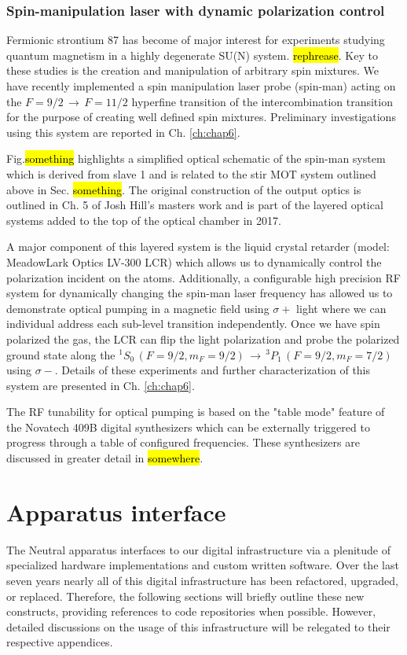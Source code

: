 \subsubsection{Spin-manipulation laser with dynamic polarization control}
Fermionic strontium 87 has become of major interest for experiments studying quantum magnetism in a highly degenerate SU(N) system. \hl{rephrease}.
Key to these studies is the creation and manipulation of arbitrary spin mixtures.
We have recently implemented a spin manipulation laser probe (spin-man) acting on the $F=9/2\,\rightarrow\,F=11/2$ hyperfine transition of the intercombination transition for the purpose of creating well defined spin mixtures.
Preliminary investigations using this system are reported in Ch. \ref{ch:chap6}.

Fig.\hl{something} highlights a simplified optical schematic of the spin-man system which is derived from slave 1 and is related to the stir MOT system outlined above in Sec. \hl{something}.
The original construction of the output optics is outlined in Ch. 5 of Josh Hill's masters work \cite{Hill2017} and is part of the layered optical systems added to the top of the optical chamber in 2017.

A major component of this layered system is the liquid crystal retarder (model: MeadowLark Optics LV-300 LCR) which allows us to dynamically control the polarization incident on the atoms.
Additionally, a configurable high precision RF system for dynamically changing the spin-man laser frequency has allowed us to demonstrate optical pumping in a magnetic field using $\sigma+$ light where we can individual address each sub-level transition independently.
Once we have spin polarized the gas, the LCR can flip the light polarization and probe the polarized ground state along the $^1S_0\,(F=9/2,m_F=9/2)\,\rightarrow\,^3P_1\,(F=9/2,m_F=7/2)$ using $\sigma-$.
Details of these experiments and further characterization of this system are presented in Ch. \ref{ch:chap6}. 

The RF tunability for optical pumping is based on the "table mode" feature of the Novatech 409B digital synthesizers which can be externally triggered to progress through a table of configured frequencies.
These synthesizers are discussed in greater detail in \hl{somewhere}.

\section{Apparatus interface} \label{sec:electronics}
\setcounter{footnote}{0}
The Neutral apparatus interfaces to our digital infrastructure via a plenitude of specialized hardware implementations and custom written software.
Over the last seven years nearly all of this digital infrastructure has been refactored, upgraded, or replaced.
Therefore, the following sections will briefly outline these new constructs, providing references to code repositories when possible.
However, detailed discussions on the usage of this infrastructure will be relegated to their respective appendices.

